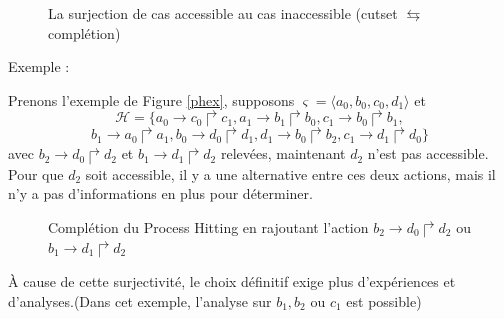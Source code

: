 \documentclass[11pt]{report}
\theoremstyle{definition}
\newcommand{\ac}[3]{$#1\to#2\Rsh#3$}
\newcommand{\acm}[3]{#1\to#2\Rsh#3}
\begin{document}
\begin{figure}
\centering
{}
\caption{La surjection de cas accessible au cas inaccessible (cutset $\leftrightarrows$ compl\'etion)}\label{surj}
\end{figure}
Exemple :

Prenons l'exemple de Figure \ref{phex}, supposons $\varsigma=\langle a_0,b_0,c_0,d_1\rangle$ et 
$$\mathscr{H}=\{\acm{a_0}{c_0}{c_1},\acm{a_1}{b_1}{b_0},\acm{c_1}{b_0}{b_1},$$
$$\acm{b_1}{a_0}{a_1},\acm{b_0}{d_0}{d_1},\acm{d_1}{b_0}{b_2},\acm{c_1}{d_1}{d_0}\}$$
avec \ac{b_2}{d_0}{d_2} et \ac{b_1}{d_1}{d_2} relev\'ees, maintenant $d_2$ n'est pas accessible. Pour que $d_2$ soit accessible, il y a une alternative entre ces deux actions, mais il n'y a pas d'informations en plus pour d\'eterminer.

\begin{figure}[ht]
\centering
{}
\caption{Compl\'etion du Process Hitting en rajoutant l'action \ac{b_2}{d_0}{d_2} ou \ac{b_1}{d_1}{d_2}}
\end{figure}
\`A cause de cette surjectivit\'e, le choix d\'efinitif exige plus d'exp\'eriences et d'analyses.(Dans cet exemple, l'analyse sur $b_1,b_2$ ou $c_1$ est possible)
\end{document}
